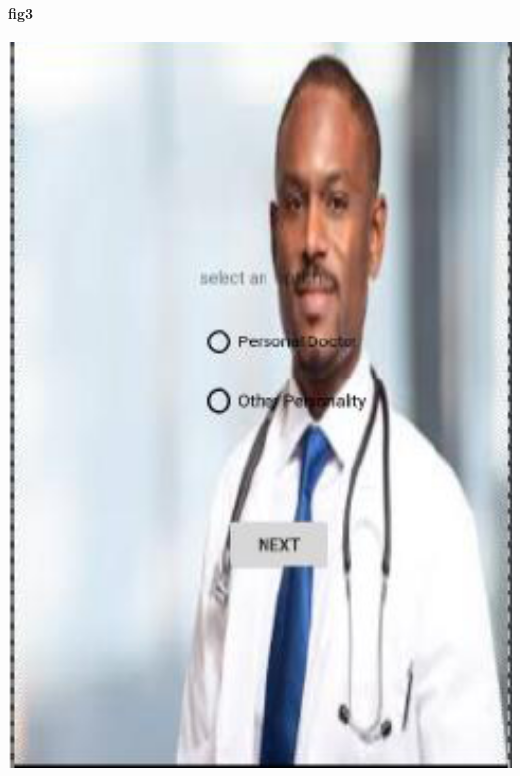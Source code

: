 \documentclass[12pt,]{article}
\begin{document}
\paragraph{fig3 }
\includegraphics[width=1.0\textwidth]{./capture3}\\[0.1in]
\end{document}
